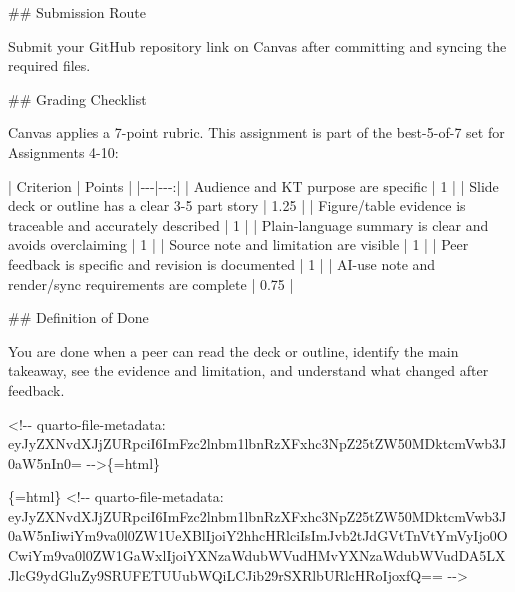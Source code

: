 \documentclass[
  letterpaper,
  DIV=11,
  numbers=noendperiod,
  oneside]{scrreprt}
\newenvironment{Shaded}{\begin{snugshade}}{\end{snugshade}}
\newcommand{\FunctionTok}[1]{\textcolor[rgb]{0.28,0.35,0.67}{#1}}
\newcommand{\InformationTok}[1]{\textcolor[rgb]{0.37,0.37,0.37}{#1}}
\newcommand{\NormalTok}[1]{\textcolor[rgb]{0.00,0.23,0.31}{#1}}
\newcommand{\PreprocessorTok}[1]{\textcolor[rgb]{0.68,0.00,0.00}{#1}}
\begin{document}
\begin{Shaded}
\begin{Highlighting}[numbers=left,,]
\FunctionTok{\#\# Submission Route}

\NormalTok{Submit your GitHub repository link on Canvas after committing and syncing the required files.}

\FunctionTok{\#\# Grading Checklist}

\NormalTok{Canvas applies a 7{-}point rubric. This assignment is part of the best{-}5{-}of{-}7 set for Assignments 4{-}10:}

\PreprocessorTok{|}\NormalTok{ Criterion }\PreprocessorTok{|}\NormalTok{ Points }\PreprocessorTok{|}
\PreprocessorTok{|{-}{-}{-}|{-}{-}{-}:|}
\PreprocessorTok{|}\NormalTok{ Audience and KT purpose are specific }\PreprocessorTok{|}\NormalTok{ 1 }\PreprocessorTok{|}
\PreprocessorTok{|}\NormalTok{ Slide deck or outline has a clear 3{-}5 part story }\PreprocessorTok{|}\NormalTok{ 1.25 }\PreprocessorTok{|}
\PreprocessorTok{|}\NormalTok{ Figure/table evidence is traceable and accurately described }\PreprocessorTok{|}\NormalTok{ 1 }\PreprocessorTok{|}
\PreprocessorTok{|}\NormalTok{ Plain{-}language summary is clear and avoids overclaiming }\PreprocessorTok{|}\NormalTok{ 1 }\PreprocessorTok{|}
\PreprocessorTok{|}\NormalTok{ Source note and limitation are visible }\PreprocessorTok{|}\NormalTok{ 1 }\PreprocessorTok{|}
\PreprocessorTok{|}\NormalTok{ Peer feedback is specific and revision is documented }\PreprocessorTok{|}\NormalTok{ 1 }\PreprocessorTok{|}
\PreprocessorTok{|}\NormalTok{ AI{-}use note and render/sync requirements are complete }\PreprocessorTok{|}\NormalTok{ 0.75 }\PreprocessorTok{|}

\FunctionTok{\#\# Definition of Done}

\NormalTok{You are done when a peer can read the deck or outline, identify the main takeaway, see the evidence and limitation, and understand what changed after feedback.}


\InformationTok{\textasciigrave{}\textless{}!{-}{-} quarto{-}file{-}metadata: eyJyZXNvdXJjZURpciI6ImFzc2lnbm1lbnRzXFxhc3NpZ25tZW50MDktcmVwb3J0aW5nIn0= {-}{-}\textgreater{}\textasciigrave{}}\NormalTok{\{=html\}}

\InformationTok{\textasciigrave{}\textasciigrave{}\textasciigrave{}\{=html\}}
\InformationTok{\textless{}!{-}{-} quarto{-}file{-}metadata: eyJyZXNvdXJjZURpciI6ImFzc2lnbm1lbnRzXFxhc3NpZ25tZW50MDktcmVwb3J0aW5nIiwiYm9va0l0ZW1UeXBlIjoiY2hhcHRlciIsImJvb2tJdGVtTnVtYmVyIjo0OCwiYm9va0l0ZW1GaWxlIjoiYXNzaWdubWVudHMvYXNzaWdubWVudDA5LXJlcG9ydGluZy9SRUFETUUubWQiLCJib29rSXRlbURlcHRoIjoxfQ== {-}{-}\textgreater{}}
\InformationTok{\textasciigrave{}\textasciigrave{}\textasciigrave{}}


\end{Highlighting}
\end{Shaded}
\end{document}
